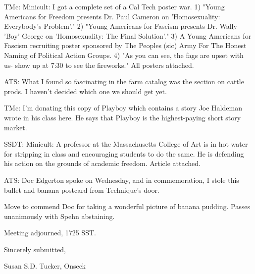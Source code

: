 \documentclass[12pt]{article}
\begin{document}
TMc: Minicult: I got a complete set of a Cal Tech poster war. 1) "Young Americans for Freedom presents Dr. Paul Cameron on 'Homosexuality: Everybody's Problem'." 2) "Young Americans for Fascism presents Dr. Wally 'Boy' George on 'Homosexuality: The Final Solution'." 3) A Young Americans for Fascism recruiting poster sponsored by The Peoples (sic) Army For The Honest Naming of Political Action Groups. 4) "As you can see, the fags are upset with us- show up at 7:30 to see the fireworks." All posters attached.

ATS: What I found so fascinating in the farm catalog was the section on cattle prods. I haven't decided which one we should get yet.

TMc: I'm donating this copy of Playboy which contains a story Joe Haldeman wrote in his class here. He says that Playboy is the highest-paying short story market.

SSDT: Minicult: A professor at the Massachusetts College of Art is in hot water for stripping in class and encouraging students to do the same. He is defending his action on the grounds of academic freedom. Article attached.

ATS: Doc Edgerton spoke on Wednesday, and in commemoration, I stole this bullet and banana postcard from Technique's door.

Move to commend Doc for taking a wonderful picture of banana pudding. Passes unanimously with Spehn abstaining.

\vspace{12pt}

\noindent
Meeting adjourned, 1725 SST.

\vspace{18pt}

\centerline{Sincerely submitted,}
\centerline{Susan S.D. Tucker, Onseck}
\end{document}
